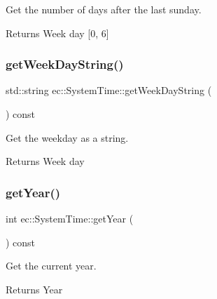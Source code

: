 Get the number of days after the last sunday. 

\begin{DoxyReturn}{Returns}
Week day \mbox{[}0, 6\mbox{]} 
\end{DoxyReturn}
\mbox{\label{classec_1_1_system_time_af7d3658fa0d222aae412f3c2131cb981}} 
\subsubsection{\texorpdfstring{get\+Week\+Day\+String()}{getWeekDayString()}}
{\footnotesize\ttfamily std\+::string ec\+::\+System\+Time\+::get\+Week\+Day\+String (\begin{DoxyParamCaption}{ }\end{DoxyParamCaption}) const}



Get the weekday as a string. 

\begin{DoxyReturn}{Returns}
Week day 
\end{DoxyReturn}
\mbox{\label{classec_1_1_system_time_a7e79f025f0cff0266f96109db2478974}} 
\subsubsection{\texorpdfstring{get\+Year()}{getYear()}}
{\footnotesize\ttfamily int ec\+::\+System\+Time\+::get\+Year (\begin{DoxyParamCaption}{ }\end{DoxyParamCaption}) const}



Get the current year. 

\begin{DoxyReturn}{Returns}
Year 
\end{DoxyReturn}
\mbox{\label{classec_1_1_system_time_ad7e667e80111e8ebc99221075eab8948}} 
